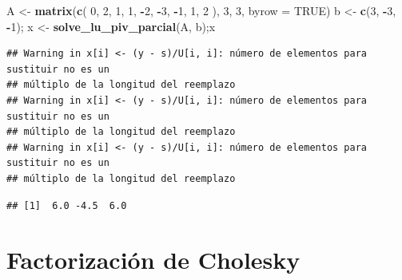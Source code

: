 \documentclass[
]{book}
\newenvironment{Shaded}{\begin{snugshade}}{\end{snugshade}}
\newcommand{\AttributeTok}[1]{\textcolor[rgb]{0.13,0.29,0.53}{#1}}
\newcommand{\ConstantTok}[1]{\textcolor[rgb]{0.56,0.35,0.01}{#1}}
\newcommand{\DecValTok}[1]{\textcolor[rgb]{0.00,0.00,0.81}{#1}}
\newcommand{\FunctionTok}[1]{\textcolor[rgb]{0.13,0.29,0.53}{\textbf{#1}}}
\newcommand{\NormalTok}[1]{#1}
\newcommand{\OtherTok}[1]{\textcolor[rgb]{0.56,0.35,0.01}{#1}}
\newcommand{\SpecialCharTok}[1]{\textcolor[rgb]{0.81,0.36,0.00}{\textbf{#1}}}
\begin{document}
\begin{Shaded}
\begin{Highlighting}[]
\NormalTok{A }\OtherTok{\textless{}{-}} \FunctionTok{matrix}\NormalTok{(}\FunctionTok{c}\NormalTok{(}
  \DecValTok{0}\NormalTok{,  }\DecValTok{2}\NormalTok{,  }\DecValTok{1}\NormalTok{,}
  \DecValTok{1}\NormalTok{, }\SpecialCharTok{{-}}\DecValTok{2}\NormalTok{, }\SpecialCharTok{{-}}\DecValTok{3}\NormalTok{,}
 \SpecialCharTok{{-}}\DecValTok{1}\NormalTok{,  }\DecValTok{1}\NormalTok{,  }\DecValTok{2}
\NormalTok{), }\DecValTok{3}\NormalTok{, }\DecValTok{3}\NormalTok{, }\AttributeTok{byrow =} \ConstantTok{TRUE}\NormalTok{)}
\NormalTok{b }\OtherTok{\textless{}{-}} \FunctionTok{c}\NormalTok{(}\DecValTok{3}\NormalTok{, }\SpecialCharTok{{-}}\DecValTok{3}\NormalTok{, }\SpecialCharTok{{-}}\DecValTok{1}\NormalTok{); x }\OtherTok{\textless{}{-}} \FunctionTok{solve\_lu\_piv\_parcial}\NormalTok{(A, b);x}
\end{Highlighting}
\end{Shaded}

\begin{verbatim}
## Warning in x[i] <- (y - s)/U[i, i]: número de elementos para sustituir no es un
## múltiplo de la longitud del reemplazo
## Warning in x[i] <- (y - s)/U[i, i]: número de elementos para sustituir no es un
## múltiplo de la longitud del reemplazo
## Warning in x[i] <- (y - s)/U[i, i]: número de elementos para sustituir no es un
## múltiplo de la longitud del reemplazo
\end{verbatim}

\begin{verbatim}
## [1]  6.0 -4.5  6.0
\end{verbatim}

\section{Factorización de Cholesky}\label{factorizaciuxf3n-de-cholesky}
\end{document}
